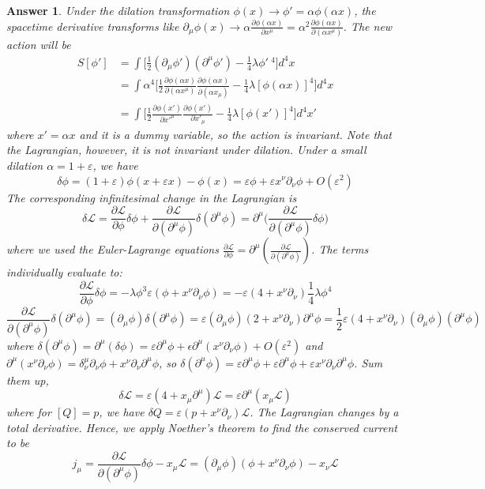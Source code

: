 \documentclass[a4paper]{article}
\newtheorem{ans}{Answer}[section]
\theoremstyle{new}
\begin{document}
\begin{ans}
Under the dilation transformation $\phi(x)\rightarrow\phi'=\alpha\phi(\alpha x)$, the spacetime derivative transforms like $\partial_\mu\phi(x)\rightarrow\alpha\frac{\partial\phi(\alpha x)}{\partial x^\mu}=\alpha^2\frac{\partial\phi(\alpha x)}{\partial(\alpha x^\mu)}$. The new action will be
\begin{align}
S[\phi']&=\int\bigg[\frac{1}{2}(\partial_\mu\phi')(\partial^\mu\phi')-\frac{1}{4}\lambda\phi'~^4\bigg]d^4x\nonumber\\&=\int\alpha^4\bigg[\frac{1}{2}\frac{\partial\phi(\alpha x)}{\partial(\alpha x^\mu)}\frac{\partial\phi(\alpha x)}{\partial(\alpha x_\mu)}-\frac{1}{4}\lambda[\phi(\alpha x)]^4\bigg]d^4x\nonumber\\&=\int\bigg[\frac{1}{2}\frac{\partial\phi(x')}{\partial x'^\mu}\frac{\partial\phi(x')}{\partial x'_\mu}-\frac{1}{4}\lambda[\phi(x')]^4\bigg]d^4x'\nonumber
\end{align}
where $x'=\alpha x$ and it is a dummy variable, so the action is invariant. Note that the Lagrangian, however, it is not invariant under dilation. Under a small dilation $\alpha=1+\varepsilon$, we have
$$\delta\phi=(1+\varepsilon)\phi(x+\varepsilon x)-\phi(x)=\varepsilon\phi+\varepsilon x^\nu\partial_\nu\phi+O(\varepsilon^2)$$
The corresponding infinitesimal change in the Lagrangian is
$$\delta\mathcal{L}=\frac{\partial\mathcal{L}}{\partial\phi}\delta\phi+\frac{\partial\mathcal{L}}{\partial(\partial^\mu\phi)}\delta(\partial^\mu\phi)=\partial^\mu\bigg(\frac{\partial\mathcal{L}}{\partial(\partial^\mu\phi)}\delta\phi\bigg)$$
where we used the Euler-Lagrange equations $\frac{\partial\mathcal{L}}{\partial\phi}=\partial^\mu(\frac{\partial\mathcal{L}}{\partial(\partial^\mu\phi)})$. The terms individually evaluate to:
$$\frac{\partial\mathcal{L}}{\partial\phi}\delta\phi=-\lambda\phi^3\varepsilon(\phi+x^\nu\partial_\nu\phi)=-\varepsilon(4+x^\nu\partial_\nu)\frac{1}{4}\lambda\phi^4$$
$$\frac{\partial\mathcal{L}}{\partial(\partial^\mu\phi)}\delta(\partial^\mu\phi)=(\partial_\mu\phi)\delta(\partial^\mu\phi)=\varepsilon(\partial_\mu\phi)(2+x^\nu\partial_\nu)\partial^\mu\phi=\frac{1}{2}\varepsilon(4+x^\nu\partial_\nu)(\partial_\mu\phi)(\partial^\mu\phi)$$
where $\delta(\partial^\mu\phi)=\partial^\mu(\delta\phi)=\varepsilon\partial^\mu\phi+\epsilon\partial^\mu(x^\nu\partial_\nu\phi)+O(\varepsilon^2)$ and $\partial^\mu(x^\nu\partial_\nu\phi)=\delta^\mu_\nu\partial_\nu\phi+x^\nu\partial_\nu\partial^\mu\phi$, so $\delta(\partial^\mu\phi)=\varepsilon\partial^\mu\phi+\varepsilon\partial^\mu\phi+\varepsilon x^\nu\partial_\nu\partial^\mu\phi$. Sum them up, 
$$\delta\mathcal{L}=\varepsilon(4+x_\mu\partial^\mu)\mathcal{L}=\varepsilon\partial^\mu(x_\mu\mathcal{L})$$
where for $[Q]=p$, we have $\delta Q=\varepsilon(p+x^\nu\partial_\nu)\mathcal{L}$. The Lagrangian changes by a total derivative. Hence, we apply Noether's theorem to find the conserved current to be
$$j_\mu=\frac{\partial\mathcal{L}}{\partial(\partial^\mu\phi)}\delta\phi-x_\mu\mathcal{L}=(\partial_\mu\phi)(\phi+x^\nu\partial_\nu\phi)-x_\nu\mathcal{L}$$
\end{ans}
\newpage
\end{document}
